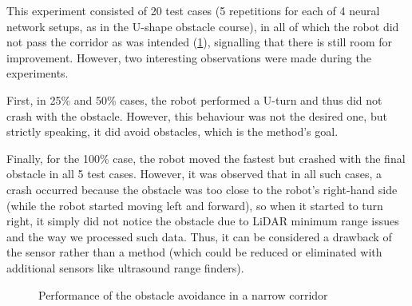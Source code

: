 This experiment consisted of 20 test cases (5 repetitions for each of 4 neural network setups, as in the U-shape obstacle course), in all of which the robot did not pass the corridor as was intended (\cref{fig:Fig10}), signalling that there is still room for improvement. However, two interesting observations were made during the experiments. 

First, in 25\% and 50\% cases, the robot performed a U-turn and thus did not crash with the obstacle. However, this behaviour was not the desired one, but strictly speaking, it did avoid obstacles, which is the method's goal. 

Finally, for the 100\% case, the robot moved the fastest but crashed with the final obstacle in all 5 test cases. However, it was observed that in all such cases, a crash occurred because the obstacle was too close to the robot’s right-hand side (while the robot started moving left and forward), so when it started to turn right, it simply did not notice the obstacle due to LiDAR minimum range issues and the way we processed such data. Thus, it can be considered a drawback of the sensor rather than a method (which could be reduced or eliminated with additional sensors like ultrasound range finders).

\begin{figure}
    \centering
    \vfill
    \caption{Performance of the obstacle avoidance in a narrow corridor}
    \label{fig:Fig10}
\end{figure}

